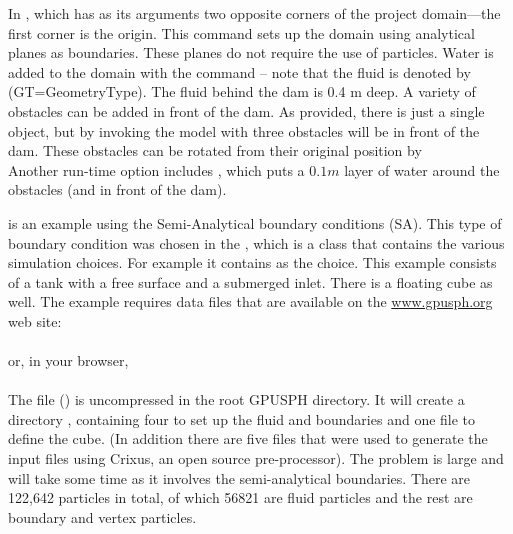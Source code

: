 \documentclass{../GPUSPHtemplate}
\begin{document}
In  , 
which has as its arguments two opposite corners of the 
project domain—the first corner is the origin. 
This command sets up the domain using analytical planes as boundaries. 
These planes do not require the use of particles.  
Water is added to the domain with the  command -- 
note that the fluid is denoted by   (GT=GeometryType).  
The fluid behind the dam is 0.4 m deep.  
A variety of obstacles can be added in front of the dam.  
As provided, there is just a single object, but by invoking the model with
three obstacles will be in front of the dam.  
These obstacles can be rotated from their original position 
by \\

Another run-time option includes , 
which puts a $0.1m$ layer of water around the obstacles (and in front of the dam).  

 is an example using the Semi-Analytical boundary conditions (SA). 
This type of boundary condition was chosen in the  , 
which is a class that contains the various simulation choices. 
For example it contains  as the choice.   
This example consists of a tank with a free surface and a submerged inlet.  
There is a floating cube as well.  
The example requires data files that are available on the \url{www.gpusph.org} web site:\\
\\

or, in your browser,\\
\\

The file () is uncompressed 
in the root GPUSPH directory.  
It will create a directory , containing four  
to set up the fluid and boundaries and one  file to define the cube.  
(In addition there are five files that were used to generate the input files 
using Crixus, an open source pre-processor).  
The problem is large and will take some time as it involves the semi-analytical boundaries.  
There are 122,642 particles in total, of which 56821 are fluid particles 
and the rest are boundary and vertex particles.  \\
\end{document}

